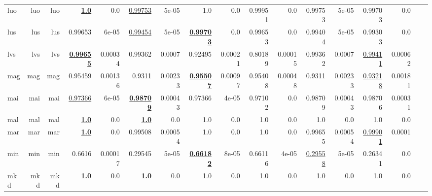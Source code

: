 \documentclass[11pt]{article}
\begin{document}
\begin{table*}[h]
{\begin{tabular}{lrrrrrrrrrrrrrrrr}
luo         & luo         & luo         & \textbf{\underline{1.0}}         & 0.0         & \underline{0.99753}         & 5e-05         & 1.0         & 0.0         & 0.99951         & 0.0         & 0.99753         & 5e-05         & 0.99703         & 0.0         \\
lus         & lus         & lus         & 0.99653         & 6e-05         & \underline{0.99454}         & 5e-05         & \textbf{\underline{0.99703}}         & 0.0         & 0.99653         & 0.0         & 0.99404         & 5e-05         & 0.99303         & 0.0         \\
lvs         & lvs         & lvs         & \textbf{\underline{0.99655}}         & 0.00034         & 0.99362         & 0.0007         & 0.92495         & 0.00021         & 0.80189         & 0.00015         & 0.99362         & 0.0007         & \underline{0.99411}         & 0.00062         \\
mag         & mag         & mag         & 0.95459         & 0.00136         & 0.9311         & 0.00233         & \textbf{\underline{0.95507}}         & 0.00097         & 0.95408         & 0.00048         & 0.9311         & 0.00233         & \underline{0.93218}         & 0.00181         \\
mai         & mai         & mai         & \underline{0.97366}         & 6e-05         & \textbf{\underline{0.98709}}         & 0.00043         & 0.97366         & 4e-05         & 0.97102         & 0.0         & 0.98709         & 0.00043         & 0.98706         & 0.00031         \\
mal         & mal         & mal         & \textbf{\underline{1.0}}         & 0.0         & \textbf{\underline{1.0}}         & 0.0         & 1.0         & 0.0         & 1.0         & 0.0         & 1.0         & 0.0         & 1.0         & 0.0         \\
mar         & mar         & mar         & \textbf{\underline{1.0}}         & 0.0         & 0.99508         & 0.00054         & 1.0         & 0.0         & 1.0         & 0.0         & 0.99655         & 0.00054         & \underline{0.99901}         & 0.0001         \\
min         & min         & min         & 0.6616         & 0.00017         & 0.29545         & 5e-05         & \textbf{\underline{0.66182}}         & 8e-05         & 0.66116         & 4e-05         & \underline{0.29558}         & 5e-05         & 0.26341         & 0.0         \\
mkd         & mkd         & mkd         & \textbf{\underline{1.0}}         & 0.0         & \textbf{\underline{1.0}}         & 0.0         & 1.0         & 0.0         & 1.0         & 0.0         & 1.0         & 0.0         & 1.0         & 0.0         \\

\end{tabular}}
\end{table*}
\end{document}
